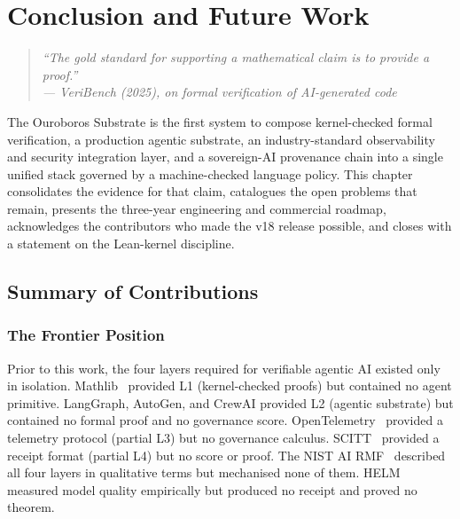 

\chapter{Conclusion and Future Work}
\label{chap:conclusion}

\begin{quote}
\itshape
``The gold standard for supporting a mathematical claim is to provide a
proof.''\\
\upshape\normalsize\hfill --- VeriBench (2025), on formal verification
of AI-generated code
\end{quote}

\bigskip

The Ouroboros Substrate is the first system to compose kernel-checked
formal verification, a production agentic substrate, an industry-standard
observability and security integration layer, and a sovereign-AI provenance
chain into a single unified stack governed by a machine-checked language
policy.
This chapter consolidates the evidence for that claim, catalogues the
open problems that remain, presents the three-year engineering and
commercial roadmap, acknowledges the contributors who made the v18 release
possible, and closes with a statement on the Lean-kernel discipline.


\section{Summary of Contributions}
\label{sec:summary}

\subsection{The Frontier Position}

Prior to this work, the four layers required for verifiable agentic AI
existed only in isolation.
Mathlib~\cite{mathlib2020} provided L1 (kernel-checked proofs) but contained
no agent primitive.
LangGraph, AutoGen, and CrewAI provided L2 (agentic substrate) but
contained no formal proof and no governance score.
OpenTelemetry~\cite{otel2023spec} provided a telemetry protocol (partial
L3) but no governance calculus.
SCITT~\cite{ietf2024scitt} provided a receipt format (partial L4) but no
score or proof.
The NIST AI RMF~\cite{nist2023ai} described all four layers in qualitative
terms but mechanised none of them.
HELM~\cite{liang2022helm} measured model quality empirically but produced
no receipt and proved no theorem.

